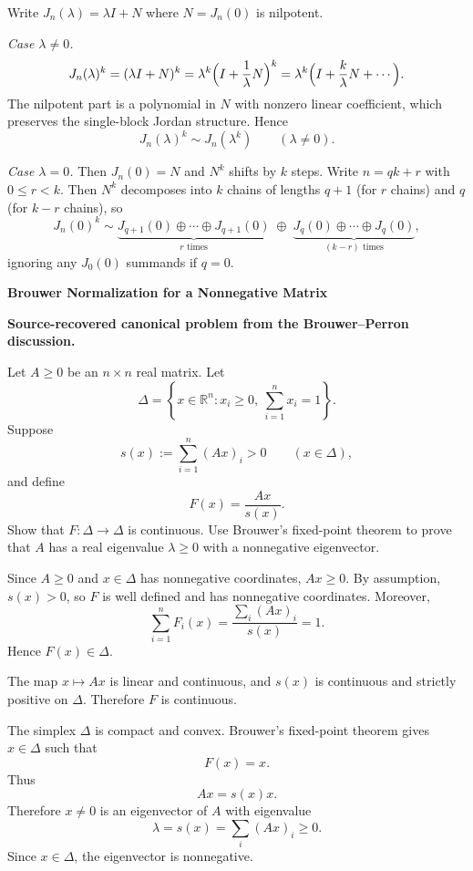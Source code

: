\begin{solution}
Write $J_n(\lambda)=\lambda I+N$ where $N=J_n(0)$ is nilpotent.

\emph{Case $\lambda\neq 0$.}
\[
J_n(\lambda)^k=(\lambda I+N)^k=\lambda^k\Bigl(I+\frac{1}{\lambda}N\Bigr)^k
=\lambda^k\Bigl(I+\frac{k}{\lambda}N+\cdots\Bigr).
\]
The nilpotent part is a polynomial in $N$ with nonzero linear coefficient, which preserves the single-block Jordan structure.
Hence
\[
J_n(\lambda)^k \sim J_n(\lambda^k)\qquad(\lambda\neq 0).
\]

\emph{Case $\lambda=0$.}
Then $J_n(0)=N$ and $N^k$ shifts by $k$ steps.
Write $n=qk+r$ with $0\le r<k$. Then $N^k$ decomposes into $k$ chains of lengths $q+1$ (for $r$ chains) and $q$ (for $k-r$ chains),
so
\[
J_n(0)^k \sim \underbrace{J_{q+1}(0)\oplus\cdots\oplus J_{q+1}(0)}_{r\text{ times}}
\;\oplus\;
\underbrace{J_q(0)\oplus\cdots\oplus J_q(0)}_{(k-r)\text{ times}},
\]
ignoring any $J_0(0)$ summands if $q=0$.
\end{solution}

\begin{problem}[CP-I-0044]
\label{prob:cp-i-0044}
\textbf{Brouwer Normalization for a Nonnegative Matrix}

\textbf{Source-recovered canonical problem from the Brouwer--Perron discussion.}

\hspace*{1.5em}Let \(A\ge0\) be an \(n\times n\) real matrix. Let
\[
\Delta=\left\{x\in\mathbb R^n:x_i\ge0,\ \sum_{i=1}^n x_i=1\right\}.
\]
Suppose
\[
s(x):=\sum_{i=1}^n(Ax)_i>0
\qquad (x\in\Delta),
\]
and define
\[
F(x)=\frac{Ax}{s(x)}.
\]
Show that \(F:\Delta\to\Delta\) is continuous. Use Brouwer's fixed-point theorem to prove that
\(A\) has a real eigenvalue \(\lambda\ge0\) with a nonnegative eigenvector.
\end{problem}

\begin{solution}
Since \(A\ge0\) and \(x\in\Delta\) has nonnegative coordinates, \(Ax\ge0\). By assumption,
\(s(x)>0\), so \(F\) is well defined and has nonnegative coordinates. Moreover,
\[
\sum_{i=1}^n F_i(x)
=
\frac{\sum_i(Ax)_i}{s(x)}
=
1.
\]
Hence \(F(x)\in\Delta\).

The map \(x\mapsto Ax\) is linear and continuous, and \(s(x)\) is continuous and strictly
positive on \(\Delta\). Therefore \(F\) is continuous.

The simplex \(\Delta\) is compact and convex. Brouwer's fixed-point theorem gives
\(x\in\Delta\) such that
\[
F(x)=x.
\]
Thus
\[
Ax=s(x)x.
\]
Therefore \(x\neq0\) is an eigenvector of \(A\) with eigenvalue
\[
\lambda=s(x)=\sum_i(Ax)_i\ge0.
\]
Since \(x\in\Delta\), the eigenvector is nonnegative.
\end{solution}

